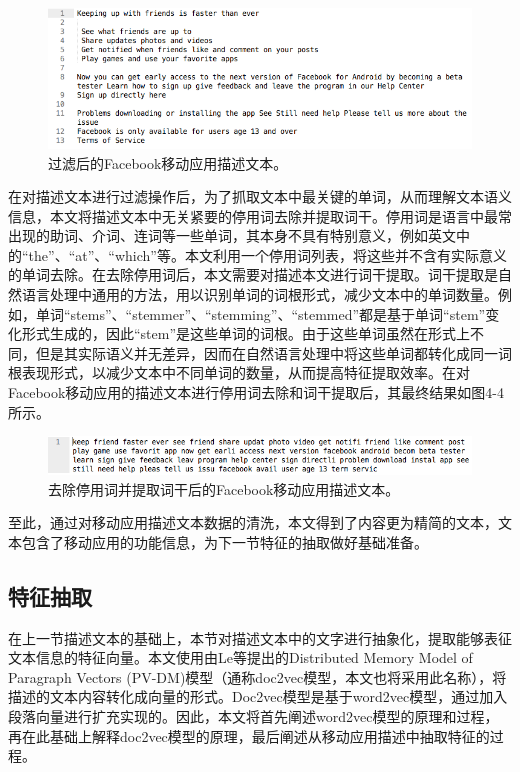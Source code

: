 \begin{figure}
	\centering
	\includegraphics[width=4.7in]{figures/desc_filter}
	\caption{过滤后的Facebook移动应用描述文本。}
\end{figure}

在对描述文本进行过滤操作后，为了抓取文本中最关键的单词，从而理解文本语义信息，本文将描述文本中无关紧要的停用词去除并提取词干。停用词是语言中最常出现的助词、介词、连词等一些单词，其本身不具有特别意义，例如英文中的“the”、“at”、“which”等。本文利用一个停用词列表，将这些并不含有实际意义的单词去除。在去除停用词后，本文需要对描述本文进行词干提取。词干提取是自然语言处理中通用的方法，用以识别单词的词根形式，减少文本中的单词数量。例如，单词“stems”、“stemmer”、“stemming”、“stemmed”都是基于单词“stem”变化形式生成的，因此“stem”是这些单词的词根。由于这些单词虽然在形式上不同，但是其实际语义并无差异，因而在自然语言处理中将这些单词都转化成同一词根表现形式，以减少文本中不同单词的数量，从而提高特征提取效率。在对Facebook移动应用的描述文本进行停用词去除和词干提取后，其最终结果如图4-4所示。

\begin{figure}
	\centering
	\includegraphics[width=4.7in]{figures/desc_stem}
	\caption{去除停用词并提取词干后的Facebook移动应用描述文本。}
\end{figure}

至此，通过对移动应用描述文本数据的清洗，本文得到了内容更为精简的文本，文本包含了移动应用的功能信息，为下一节特征的抽取做好基础准备。


\subsection{特征抽取}
在上一节描述文本的基础上，本节对描述文本中的文字进行抽象化，提取能够表征文本信息的特征向量。本文使用由Le等提出的Distributed Memory Model of Paragraph Vectors (PV-DM)模型\cite{le2014distributed}（通称doc2vec模型，本文也将采用此名称），将描述的文本内容转化成向量的形式。Doc2vec模型是基于word2vec模型\cite{mikolov2013efficient}，通过加入段落向量进行扩充实现的。因此，本文将首先阐述word2vec模型的原理和过程，再在此基础上解释doc2vec模型的原理，最后阐述从移动应用描述中抽取特征的过程。

